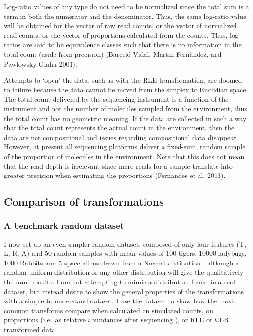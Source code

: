 \documentclass[onecolumn]{article}
\begin{document}
Log-ratio values of any type do not need to be normalized since the total sum is a term in both the numerator and the denominator. Thus, the same log-ratio value will be obtained for the vector of raw read counts, or the vector of normalized read counts, or the vector of proportions calculated from the counts. Thus, log-ratios are said to be equivalence classes such that there is no information in the total count (aside from precision) (Barceló-Vidal, Martin-Fernàndez, and Pawlowsky-Glahn 2001).

Attempts to `open' the data, such as with the RLE transformation, are doomed to failure because the data cannot be moved from the simplex to Euclidian space. The total count delivered by the sequencing instrument is a function of the instrument and not the number of molecules sampled from the environment, thus the total count has no geometric meaning. If the data are collected in such a way that the total count represents the actual count in the environment, then the data are not compositional and issues regarding compositional data disappear. However, at present all sequencing platforms deliver a fixed-sum, random sample of the proportion of molecules in the environment. Note that this does not mean that the read depth is irrelevant since more reads for a sample translate into greater precision when estimating the proportions (Fernandes et al. 2013).

\hypertarget{comparison-of-transformations}{%
\subsection{Comparison of transformations}\label{comparison-of-transformations}}

\hypertarget{a-benchmark-random-dataset}{%
\subsubsection{A benchmark random dataset}\label{a-benchmark-random-dataset}}

I now set up an even simpler random dataset, composed of only four features (T, L, R, A) and 50 random samples with mean values of 100 tigers, 10000 ladybugs, 1000 Rabbits and 5 space aliens drawn from a Normal distibution---although a random uniform distribution or any other distribution will give the qualitatively the same results. I am not attempting to mimic a distribution found in a real dataset, but instead desire to show the general properties of the transformations with a simple to understand dataset. I use the dataset to show how the most common transforms compare when calculated on simulated counts, on proportions (i.e.~as relative abundances after sequencing
), or RLE or CLR transformed data
\end{document}
